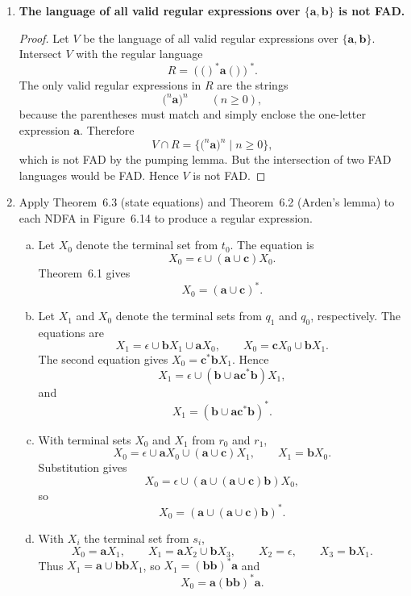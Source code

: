 \begin{enumerate}[{6.}1.]
\item \textbf{The language of all valid regular expressions over $\{\pmb{a},\pmb{b}\}$ is not FAD.}

\begin{proof}
Let $V$ be the language of all valid regular expressions over
$\{\pmb{a},\pmb{b}\}$.  Intersect $V$ with the regular language
\[
R=(\pmb{(})^*\pmb{a}(\pmb{)})^*.
\]
The only valid regular expressions in $R$ are the strings
\[
\pmb{(}^n\pmb{a}\pmb{)}^n \qquad (n\ge 0),
\]
because the parentheses must match and simply enclose the one-letter expression
$\pmb{a}$.  Therefore
\[
V\cap R=\{\pmb{(}^n\pmb{a}\pmb{)}^n\mid n\ge 0\},
\]
which is not FAD by the pumping lemma.  But the intersection of two FAD
languages would be FAD.  Hence $V$ is not FAD.
\end{proof}

	\item Apply Theorem~6.3 (state equations) and Theorem~6.2 (Arden's lemma) to each NDFA in Figure~6.14 to produce a regular expression.

	\begin{enumerate}[(a)]
	  \item Let $X_0$ denote the terminal set from $t_0$.  The equation is
	  \[
	  X_0=\epsilon\cup(\pmb{a}\cup\pmb{c})X_0.
	  \]
	  Theorem~6.1 gives
	  \[
	  X_0=(\pmb{a}\cup\pmb{c})^*.
	  \]

	  \item Let $X_1$ and $X_0$ denote the terminal sets from $q_1$ and $q_0$,
	  respectively.  The equations are
	  \[
	  X_1=\epsilon\cup\pmb{b}X_1\cup\pmb{a}X_0,
	  \qquad
	  X_0=\pmb{c}X_0\cup\pmb{b}X_1.
	  \]
	  The second equation gives $X_0=\pmb{c}^*\pmb{b}X_1$.  Hence
	  \[
	  X_1=\epsilon\cup(\pmb{b}\cup\pmb{a}\pmb{c}^*\pmb{b})X_1,
	  \]
	  and
	  \[
	  X_1=(\pmb{b}\cup\pmb{a}\pmb{c}^*\pmb{b})^*.
	  \]

	  \item With terminal sets $X_0$ and $X_1$ from $r_0$ and $r_1$,
	  \[
	  X_0=\epsilon\cup\pmb{a}X_0\cup(\pmb{a}\cup\pmb{c})X_1,
	  \qquad
	  X_1=\pmb{b}X_0.
	  \]
	  Substitution gives
	  \[
	  X_0=\epsilon\cup(\pmb{a}\cup(\pmb{a}\cup\pmb{c})\pmb{b})X_0,
	  \]
	  so
	  \[
	  X_0=(\pmb{a}\cup(\pmb{a}\cup\pmb{c})\pmb{b})^*.
	  \]

	  \item With $X_i$ the terminal set from $s_i$,
	  \[
	  X_0=\pmb{a}X_1,\qquad
	  X_1=\pmb{a}X_2\cup\pmb{b}X_3,\qquad
	  X_2=\epsilon,\qquad
	  X_3=\pmb{b}X_1.
	  \]
	  Thus $X_1=\pmb{a}\cup\pmb{bb}X_1$, so
	  $X_1=(\pmb{bb})^*\pmb{a}$ and
	  \[
	  X_0=\pmb{a}(\pmb{bb})^*\pmb{a}.
	  \]


\end{enumerate}
\end{enumerate}
